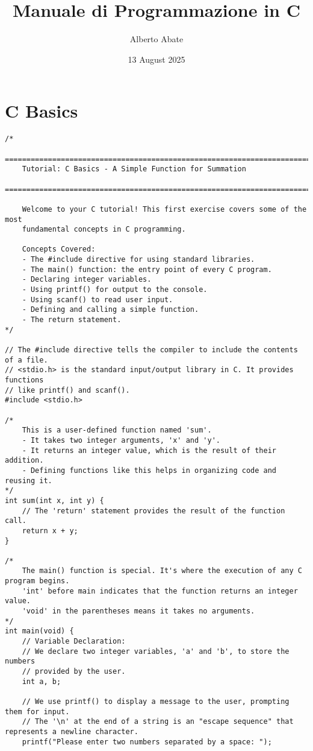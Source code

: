 \documentclass[11pt]{book}
\title{Manuale di Programmazione in C}
\author{Alberto Abate}
\date{13 August 2025}
\begin{document}
\maketitle
\tableofcontents
\newpage
\chapter{C Basics}
\clearpage
\begin{verbatim}
/*
    ================================================================================
    Tutorial: C Basics - A Simple Function for Summation
    ================================================================================

    Welcome to your C tutorial! This first exercise covers some of the most
    fundamental concepts in C programming.

    Concepts Covered:
    - The #include directive for using standard libraries.
    - The main() function: the entry point of every C program.
    - Declaring integer variables.
    - Using printf() for output to the console.
    - Using scanf() to read user input.
    - Defining and calling a simple function.
    - The return statement.
*/

// The #include directive tells the compiler to include the contents of a file.
// <stdio.h> is the standard input/output library in C. It provides functions
// like printf() and scanf().
#include <stdio.h>

/*
    This is a user-defined function named 'sum'.
    - It takes two integer arguments, 'x' and 'y'.
    - It returns an integer value, which is the result of their addition.
    - Defining functions like this helps in organizing code and reusing it.
*/
int sum(int x, int y) {
    // The 'return' statement provides the result of the function call.
    return x + y;
}

/*
    The main() function is special. It's where the execution of any C program begins.
    'int' before main indicates that the function returns an integer value.
    'void' in the parentheses means it takes no arguments.
*/
int main(void) {
    // Variable Declaration:
    // We declare two integer variables, 'a' and 'b', to store the numbers
    // provided by the user.
    int a, b;

    // We use printf() to display a message to the user, prompting them for input.
    // The '\n' at the end of a string is an "escape sequence" that represents a newline character.
    printf("Please enter two numbers separated by a space: ");


\end{verbatim}
\end{document}

